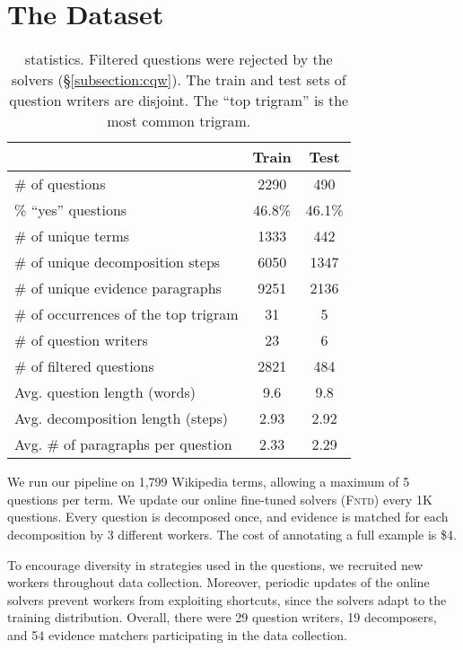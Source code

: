 {\section{The \strategyqa{} Dataset}
\label{sec:strategyqa}

\begin{table}[t]
    \centering
    \footnotesize
    {
    \begin{tabular}{p{4.6cm}|c|c}
         & Train & Test \\ \toprule
        \# of questions  & 2290 & 490 \\
        \% ``yes'' questions & 46.8\% & 46.1\% \\  
        \# of unique terms  & 1333 & 442 \\
        \# of unique decomposition steps  & 6050 & 1347 \\ 
        \# of unique evidence paragraphs  & 9251 & 2136 \\
        \# of occurrences of the top trigram   & 31 & 5 \\ \hline
        \# of question writers  &  23 & 6 \\
        \# of filtered questions  & 2821 & 484 \\ \hline
        Avg. question length (words)  & 9.6 & 9.8 \\
        Avg. decomposition length (steps) & 2.93 & 2.92 \\
        Avg. \# of paragraphs per question  & 2.33 & 2.29 \\
    \end{tabular}
    }
    \caption{\strategyqa{} statistics. Filtered questions were rejected by the solvers 
    (\S\ref{subsection:cqw}). The train and test sets of question writers are disjoint. 
    The ``top trigram'' is the most common trigram.
    }
    \label{table:dataset_statistics}
\end{table}

We run our pipeline on 1,799 Wikipedia terms, allowing a maximum of 5 questions per term. We update our online fine-tuned solvers (\textsc{Fntd}) every 1K questions. Every question is decomposed once, and evidence is matched for each decomposition by 3 different workers. The cost of annotating a full example is \$4.

To encourage diversity in strategies used in the questions, we recruited new workers throughout data collection. 
Moreover, periodic updates of the online solvers prevent workers from exploiting shortcuts, since the solvers adapt to the training distribution.
Overall, there were 29 question writers, 19 decomposers, and 54 evidence matchers participating in the data collection.

}
